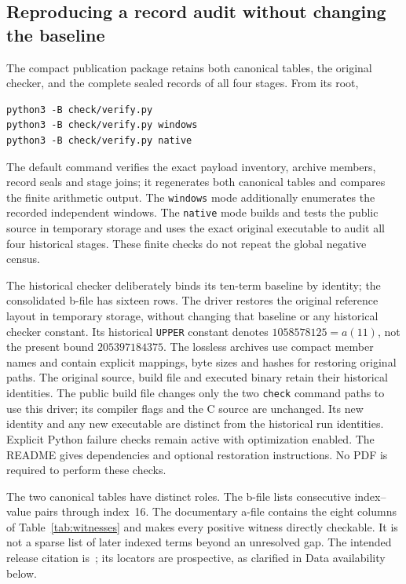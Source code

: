 \documentclass[11pt,a4paper]{article}
\theoremstyle{definition}
\theoremstyle{remark}
\begin{document}
\subsection{Reproducing a record audit without changing the baseline}\label{sec:reproduce}
The compact publication package retains both canonical tables, the original
checker, and the complete sealed records of all four stages. From its root,
\begin{verbatim}
python3 -B check/verify.py
python3 -B check/verify.py windows
python3 -B check/verify.py native
\end{verbatim}
The default command verifies the exact payload inventory, archive members,
record seals and stage joins; it regenerates both canonical tables and
compares the finite arithmetic output. The \texttt{windows} mode additionally
enumerates the recorded independent windows. The \texttt{native} mode builds
and tests the public source in temporary storage and uses the exact original
executable to audit all four historical stages. These finite checks do not
repeat the global negative census.

The historical checker deliberately binds its ten-term baseline by identity;
the consolidated b-file has sixteen rows. The driver restores the original
reference layout in temporary storage, without changing that baseline or any
historical checker constant. Its historical \texttt{UPPER} constant denotes
$1058578125=a(11)$, not the present bound $205397184375$.
The lossless archives use compact member names and contain explicit mappings,
byte sizes and hashes for restoring original paths. The original source,
build file and executed binary retain their historical identities. The public
build file changes only the two \texttt{check} command paths to use this driver;
its compiler flags and the C source are unchanged. Its new identity and any
new executable are distinct from the historical run identities. Explicit
Python failure checks remain active with optimization enabled. The README
gives dependencies and optional restoration instructions. No PDF is required
to perform these checks.

The two canonical tables have distinct roles. The b-file lists consecutive
index--value pairs through index~16. The documentary a-file contains the
eight columns of Table~\ref{tab:witnesses} and makes every positive witness
directly checkable. It is not a sparse list of later indexed terms beyond
an unresolved gap. The intended release citation is~\cite{project}; its locators are prospective,
as clarified in Data availability below.
\end{document}
